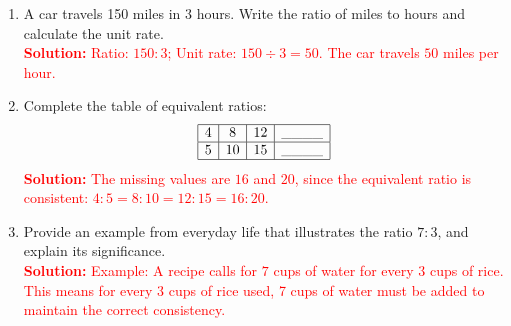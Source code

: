 \documentclass[12pt]{article}
\begin{document}
\begin{tcolorbox}[colframe=black!60, colback=white, 
coltitle=black, colbacktitle=black!15, fonttitle=\bfseries\Large, 
title=Exercises, halign title=center, left=10pt, right=10pt, top=10pt, bottom=60pt]
\begin{enumerate}[itemsep=1.35em]
    \item A car travels 150 miles in 3 hours. Write the ratio of miles to hours and calculate the unit rate.\\
    \textcolor{red}{\textbf{Solution:} Ratio: \(150:3\); Unit rate: \(150 \div 3 = 50\). The car travels \(50\) miles per hour.}

    \item Complete the table of equivalent ratios:
    \[
    \begin{array}{|c|c|c|c|}
    \hline
    4 & 8 & 12 & \_\_\_\_ \\
    \hline
    5 & 10 & 15 & \_\_\_\_ \\
    \hline
    \end{array}
    \]
    \textcolor{red}{\textbf{Solution:} The missing values are \(16\) and \(20\), since the equivalent ratio is consistent: \(4:5 = 8:10 = 12:15 = 16:20\).}

    \item Provide an example from everyday life that illustrates the ratio \( 7:3 \), and explain its significance.\\
    \textcolor{red}{\textbf{Solution:} Example: A recipe calls for \(7\) cups of water for every \(3\) cups of rice. This means for every 3 cups of rice used, 7 cups of water must be added to maintain the correct consistency.}
\end{enumerate}
\end{tcolorbox}
\end{document}
